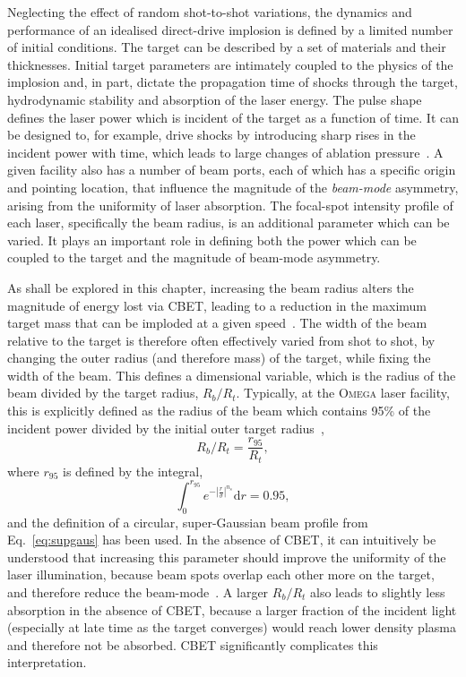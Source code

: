 Neglecting the effect of random shot-to-shot variations, the dynamics and performance of an idealised direct-drive implosion is defined by a limited number of initial conditions.
The target can be described by a set of materials and their thicknesses.
Initial target parameters are intimately coupled to the physics of the implosion and, in part, dictate the propagation time of shocks through the target, hydrodynamic stability and absorption of the laser energy.
The pulse shape defines the laser power which is incident of the target as a function of time.
It can be designed to, for example, drive shocks by introducing sharp rises in the incident power with time, which leads to large changes of ablation pressure~\cite{scott_shockaugmented_2022}.
A given facility also has a number of beam ports, each of which has a specific origin and pointing location, that influence the magnitude of the \textit{beam-mode} asymmetry, arising from the uniformity of laser absorption.
The focal-spot intensity profile of each laser, specifically the beam radius, is an additional parameter which can be varied.
It plays an important role in defining both the power which can be coupled to the target and the magnitude of beam-mode asymmetry.

As shall be explored in this chapter, increasing the beam radius alters the magnitude of energy lost via \ac{CBET}, leading to a reduction in the maximum target mass that can be imploded at a given speed~\cite{froula_increasing_2012}.
The width of the beam relative to the target is therefore often effectively varied from shot to shot, by changing the outer radius (and therefore mass) of the target, while fixing the width of the beam.
This defines a dimensional variable, which is the radius of the beam divided by the target radius, $R_b/R_t$.
Typically, at the \textsc{Omega} laser facility, this is explicitly defined as the radius of the beam which contains 95\% of the incident power divided by the initial outer target radius~\cite{froula_increasing_2012,colaitis_exploration_2023,anderson_enhanced_2024},
\begin{equation}
    R_b/R_t = \frac{r_{95}}{R_t},
\end{equation}
where $r_{95}$ is defined by the integral,
\begin{equation}
    \label{eq:Res1_r95}
    \int_0^{r_{95}}e^{- \left| \frac{r}{\sigma} \right| ^{n_s}}\text{d}r = 0.95,
\end{equation}
and the definition of a circular, super-Gaussian beam profile from Eq.~\ref{eq:supgaus} has been used.
In the absence of \ac{CBET}, it can intuitively be understood that increasing this parameter should improve the uniformity of the laser illumination, because beam spots overlap each other more on the target, and therefore reduce the beam-mode~\cite{lees_understanding_2023}.
A larger $R_b/R_t$ also leads to slightly less absorption in the absence of \ac{CBET}, because a larger fraction of the incident light (especially at late time as the target converges) would reach lower density plasma and therefore not be absorbed.
\ac{CBET} significantly complicates this interpretation.

